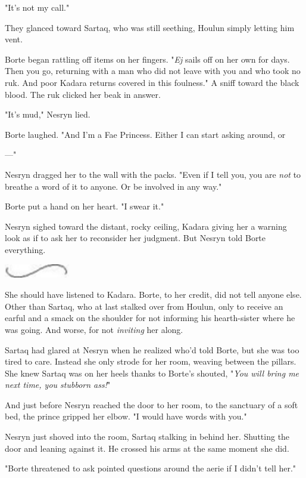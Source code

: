"It's not my call."

They glanced toward Sartaq, who was still seething, Houlun simply letting him vent.

Borte began rattling off items on her fingers. "\emph{Ej} sails off on her own for days. Then you go, returning with a man who did not leave with you and who took no ruk. And poor Kadara returns covered in this
 foulness." A sniff toward the black blood. The ruk clicked her beak in answer.

"It's mud," Nesryn lied.

Borte laughed. "And I'm a Fae Princess. Either I can start asking around, or

---"

Nesryn dragged her to the wall with the packs. "Even if I tell you, you are \emph{not} to breathe a word of it to anyone. Or be involved in any way."

Borte put a hand on her heart. "I swear it."

Nesryn sighed toward the distant, rocky ceiling, Kadara giving her a warning look as if to ask her to reconsider her judgment. But Nesryn told Borte everything.

\includegraphics[width=1.12in,height=0.24in]{images/seperator}

She should have listened to Kadara. Borte, to her credit, did not tell anyone else. Other than Sartaq, who at last stalked over from Houlun, only to receive an earful and a smack on the shoulder for not informing his hearth-sister where he was going. And worse, for not \emph{inviting}
her along.

Sartaq had glared at Nesryn when he realized who'd told Borte, but she was too tired to care. Instead she only strode for her room, weaving between the pillars. She knew Sartaq was on her heels thanks to Borte's shouted, "\emph{You will bring me next time, you stubborn ass!}"

And just before Nesryn reached the door to her room, to the sanctuary of a soft bed, the prince gripped her elbow. "I would have words with you."

Nesryn just shoved into the room, Sartaq stalking in behind her. Shutting the door and leaning against it. He crossed his arms at the same moment she did.

"Borte threatened to ask pointed questions around the aerie if I didn't tell her."

